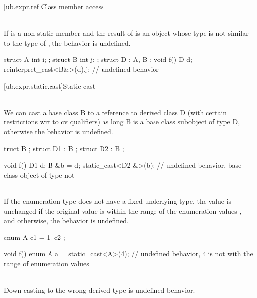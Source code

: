 [ub.expr.ref]{Class member access}

\pnum
{} \\
If  is a non-static member and the result of  is an object whose type
is not similar to the type of , the behavior is undefined.

\pnum
\begin{example}
\begin{codeblock}
struct A { int i; };
struct B { int j; };
struct D : A, B {};
void f() {
  D d;
  reinterpret_cast<B&>(d).j;    // undefined behavior
}
\end{codeblock}
\end{example}


[ub.expr.static.cast]{Static cast}

\pnum
{} \\
We can cast a base class B to a reference to derived class D (with certain restrictions wrt to cv qualifiers)
as long B is a base class subobject of type D, otherwise the behavior is undefined.

\pnum
\begin{example}
\begin{codeblock}
truct B {};
struct D1 : B {};
struct D2 : B {};

void f() {
  D1 d;
  B &b = d;
  static_cast<D2 &>(b); // undefined behavior, base class object of type  not 
}
\end{codeblock}
\end{example}

\pnum
{} \\
If the enumeration type does not have a fixed underlying
type, the value is unchanged if the original value is within the range of the enumeration values , and
otherwise, the behavior is undefined.

\pnum
\begin{example}
\begin{codeblock}
enum A { e1 = 1, e2 };

void f() {
  enum A a = static_cast<A>(4); // undefined behavior, 4 is not with the range of enumeration values
}
\end{codeblock}
\end{example}

\pnum
{} \\
Down-casting to the wrong derived type is undefined behavior.

